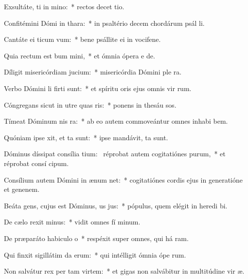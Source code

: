 \item Exsultáte, ti in mino:~* rectos decet tio.
\item Confitémini Dómi in thara:~* in psaltério decem chordárum psál li.
\item Cantáte ei ticum vum:~* bene psállite ei in vocifene.
\item Quia rectum est bum mini,~* et ómnia ópera e  de.
\item Díligit misericórdiam  jucium:~* misericórdia Dómini ple  ra.
\item Verbo Dómini li firti sunt:~* et spíritu oris ejus omnis vir rum.
\item Cóngregans sicut in utre quas ris:~* ponens in thesáu sos.
\item Tímeat Dóminum nis ra:~* ab eo autem commoveántur omnes inhabi bem.
\item Quóniam ipse xit, et ta sunt:~* ipse mandávit,  ta sunt.
\item Dóminus díssipat consília tium:~\pscross{} réprobat autem cogitatiónes purum,~* et réprobat consí cipum.
\item Consílium autem Dómini in ænum net:~* cogitatiónes cordis ejus in generatióne et genenem.
\item Beáta gens, cujus est Dóminus, us jus:~* pópulus, quem elégit in heredi bi.
\item De cælo rexit minus:~* vidit omnes fí minum.
\item De præparáto habiculo o~* respéxit super omnes, qui há ram.
\item Qui finxit sigillátim da erum:~* qui intélligit ómnia ópe rum.
\item Non salvátur rex per tam virtem:~* et gigas non salvábitur in multitúdine vir æ.
